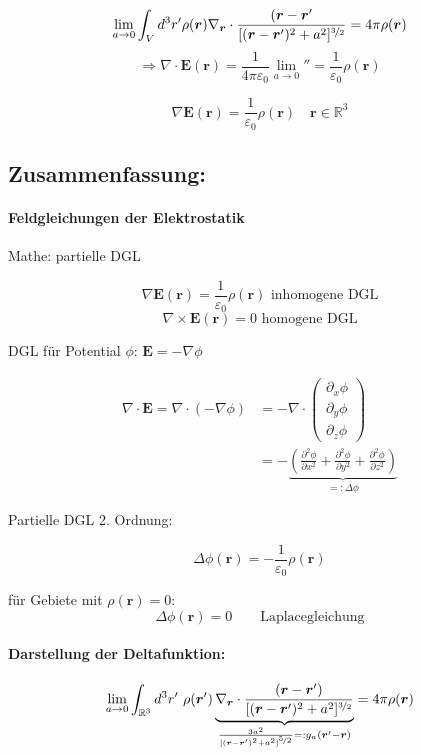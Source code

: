 \documentclass[titlepage,11pt,a4paper,ngerman]{report}
\newcommand{\kq}{\frac{1}{4\pi\epsilon_0}}
\renewcommand{\vec}[1]{\boldsymbol{#1}}
\renewcommand{\epsilon}{\varepsilon}
\newcommand{\frbox}[2]{\begin{tcolorbox}[colback=white,colframe=red!75!black,fonttitle=\bfseries,title=#1]#2\end{tcolorbox}}
\newcommand{\rbox}[1]{\begin{tcolorbox}[colback=white,colframe=red!75!black]#1\end{tcolorbox}}
\begin{document}
$$\lim_{a \to 0} \int_V d^3 r' \rho(\vec{r}) \nabla_{\vec{r}}\cdot \frac{(\vec{r}-\vec{r}'}{[(\vec{r}-\vec{r}')^2 + a^2]^{\nicefrac{3}{2}}} = 4 \pi \rho (\vec{r})$$
$$\Rightarrow \nabla \cdot \vec{E}(\vec{r}) = \kq \lim_{a \to 0} '' = \frac{1}{\epsilon_0} \rho(\vec{r})$$

\rbox{$$\nabla \vec{E}(\vec{r}) = \frac{1}{\epsilon_0} \rho(\vec{r}) \quad \vec{r} \in \mathbb R^3$$}

\subsection{Zusammenfassung:}

\paragraph{Feldgleichungen der Elektrostatik}
Mathe: partielle DGL
\rbox{$$\nabla \vec{E}(\vec{r}) = \frac{1}{\epsilon_0} \rho(\vec{r}) \textrm{ inhomogene DGL}$$ 
	$$\nabla \times \vec{E}(\vec{r}) = 0\textrm{ homogene DGL}$$}
DGL für Potential $\phi$: 
$\vec{E} = - \nabla \phi$

\begin{align*}\nabla \cdot \vec{E} = \nabla \cdot (- \nabla \phi) &= - \nabla \cdot \begin{pmatrix} 
\partial_x \phi \\
\partial_y \phi \\ 
\partial_z \phi 
\end{pmatrix} \\
&= - \underbrace{\left( \frac{\partial^2 \phi}{\partial x^2} + \frac{\partial^2 \phi}{\partial y^2} + \frac{\partial^2 \phi}{\partial  z^2} \right) }_{=: \Delta \phi}\end{align*}

Partielle DGL 2. Ordnung:
\frbox{Poissongleichung}{$$\Delta \phi(\vec{r}) = - \frac{1}{\epsilon_0} \rho(\vec{r})$$}

für Gebiete mit $\rho (\vec{r}) = 0$:
$$\Delta \phi (\vec{r}) = 0 \qquad \textrm{Laplacegleichung}$$

\paragraph{Darstellung der Deltafunktion:}

$$\lim_{a \to 0} \int_{\mathbb{R}^3} d^3r'\ \rho(\vec{r}')\underbrace{\nabla_{\vec{r}} \cdot \frac{(\vec{r} - \vec{r}')}{[(\vec{r} - \vec{r}')^2 + a^2]^{\nicefrac{3}{2}}}}_{\frac{3 a^2}{[(\vec{r} - \vec{r}')^2 + a^2]^{\nicefrac{5}{2}}} =: g_a(\vec{r}' - \vec{r})} = 4 \pi \rho(\vec{r})$$
\end{document}
